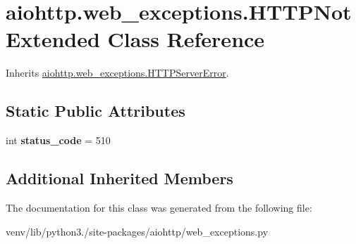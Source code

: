 \hypertarget{classaiohttp_1_1web__exceptions_1_1_h_t_t_p_not_extended}{}\section{aiohttp.\+web\+\_\+exceptions.\+H\+T\+T\+P\+Not\+Extended Class Reference}
\label{classaiohttp_1_1web__exceptions_1_1_h_t_t_p_not_extended}


Inherits \hyperlink{classaiohttp_1_1web__exceptions_1_1_h_t_t_p_server_error}{aiohttp.\+web\+\_\+exceptions.\+H\+T\+T\+P\+Server\+Error}.

\subsection*{Static Public Attributes}
\begin{DoxyCompactItemize}
\item 
\mbox{\label{classaiohttp_1_1web__exceptions_1_1_h_t_t_p_not_extended_a2f6a3cfc00baad094b41df7389ec2910}} 
int {\bfseries status\+\_\+code} = 510
\end{DoxyCompactItemize}
\subsection*{Additional Inherited Members}


The documentation for this class was generated from the following file\+:\begin{DoxyCompactItemize}
\item 
venv/lib/python3./site-\/packages/aiohttp/web\+\_\+exceptions.\+py\end{DoxyCompactItemize}
